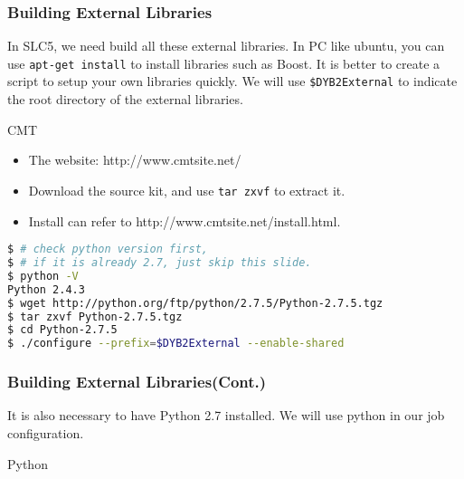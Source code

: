 \begin{frame}
    \frametitle{Building External Libraries}
    In SLC5, we need build all these external libraries.
    In PC like ubuntu, you can use {\tt apt-get install} to install
    libraries such as Boost.
    It is better to create a script to setup your own
    libraries quickly.
    We will use {\tt \$DYB2External} to indicate the root directory
    of the external libraries.
    \begin{block}{CMT}
        \begin{itemize}
            \item The website: http://www.cmtsite.net/
            \item Download the source kit, and use 
                {\tt tar zxvf} to extract it.
            \item Install can refer to 
                http://www.cmtsite.net/install.html.
        \end{itemize}
        \par\usebox{\installcmt}
    \end{block}
\end{frame}

\newsavebox{\installpython}
\begin{lrbox}{\installpython}
\begin{lstlisting}[language=bash]
$ # check python version first, 
$ # if it is already 2.7, just skip this slide.
$ python -V
Python 2.4.3
$ wget http://python.org/ftp/python/2.7.5/Python-2.7.5.tgz
$ tar zxvf Python-2.7.5.tgz 
$ cd Python-2.7.5
$ ./configure --prefix=$DYB2External --enable-shared
\end{lstlisting}
\end{lrbox}

\begin{frame}
    \frametitle{Building External Libraries(Cont.)}
    It is also necessary to have Python 2.7 installed.
    We will use python in our job configuration.

    \begin{block}{Python}
        \par\usebox{\installpython}
    \end{block}
\end{frame}
